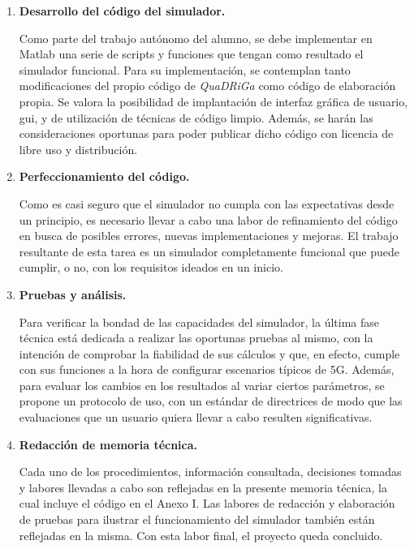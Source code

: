 \begin{enumerate}
     \item \textbf{Desarrollo del código del simulador.}
     
        Como parte del trabajo autónomo del alumno, se debe implementar en Matlab una serie de scripts y funciones que tengan como resultado el simulador funcional. Para su implementación, se contemplan tanto modificaciones del propio código de \textit{QuaDRiGa} como código de elaboración propia. Se valora la posibilidad de implantación de interfaz gráfica de usuario, \ac{gui}, y de utilización de técnicas de código limpio. Además, se harán las consideraciones oportunas para poder publicar dicho código con licencia de libre uso y distribución.
     
     \item \textbf{Perfeccionamiento del código.}
     
        Como es casi seguro que el simulador no cumpla con las expectativas desde un principio, es necesario llevar a cabo una labor de refinamiento del código en busca de posibles errores, nuevas implementaciones y mejoras. El trabajo resultante de esta tarea es un simulador completamente funcional que puede cumplir, o no, con los requisitos ideados en un inicio.
     
     \item \textbf{Pruebas y análisis.}
     
        Para verificar la bondad de las capacidades del simulador, la última fase técnica está dedicada a realizar las oportunas pruebas al mismo, con la intención de comprobar la fiabilidad de sus cálculos y que, en efecto, cumple con sus funciones a la hora de configurar escenarios típicos de 5G. Además, para evaluar los cambios en los resultados al variar ciertos parámetros, se propone un protocolo de uso, con un estándar de directrices de modo que las evaluaciones que un usuario quiera llevar a cabo resulten significativas.
     
     \item \textbf{Redacción de memoria técnica.}
     
        Cada uno de los procedimientos, información consultada, decisiones tomadas y labores llevadas a cabo son reflejadas en la presente memoria técnica, la cual incluye el código en el Anexo I. Las labores de redacción y elaboración de pruebas para ilustrar el funcionamiento del simulador también están reflejadas en la misma. Con esta labor final, el proyecto queda concluido.
 \end{enumerate}
 
